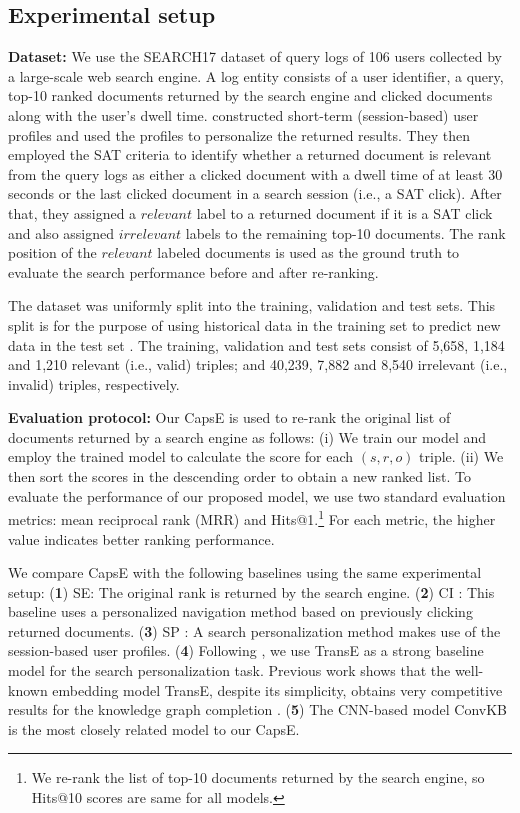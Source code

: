 \documentclass[11pt,a4paper]{article}
\begin{document}
\subsection{Experimental setup}

\noindent\textbf{Dataset:} 
We use the SEARCH17 dataset \citep{vu2017search} of query logs of 106 users collected by a large-scale web search engine.
A log entity consists of a user identifier, a query, top-10 ranked documents returned by the search engine and clicked documents along with the user's dwell time. \citet{vu2017search} constructed short-term (session-based) user profiles and used the profiles to personalize the returned results.
They then employed the SAT criteria \citep{FoxE2005} to identify whether a returned document is relevant from the query logs as either a clicked document with a dwell time of at least 30 seconds or the last clicked document in a search session (i.e., a SAT click). 
After that, they assigned a $relevant$ label to a returned document if it is a SAT click and also assigned $irrelevant$ labels to the remaining top-10 documents.
The rank position of the $relevant$ labeled documents is used as the ground truth to evaluate the search performance before and after re-ranking.



The dataset was uniformly split into the training, validation and test sets. This split is for the purpose of using historical data in the training set to predict new data in the test set \citep{vu2017search}. The training, validation and test sets consist of 5,658, 1,184 and 1,210 relevant (i.e., valid) triples; and 40,239, 7,882 and 8,540 irrelevant (i.e., invalid) triples, respectively.

\noindent\textbf{Evaluation protocol:} 
Our CapsE is used to re-rank the original list of documents returned by a search engine as follows: (i) We train our model and employ the trained model to calculate the score for each  $(s, r, o)$ triple. (ii) We then sort the scores in the descending order to obtain a new ranked list.
To evaluate the performance of our proposed model, we use two standard evaluation metrics: mean reciprocal rank (MRR) and Hits@1.\footnote{We re-rank the list of top-10 documents returned by the search engine, so Hits@10 scores are same for all models.}
For each metric, the higher value indicates better ranking performance.

We compare CapsE with the following baselines using the same experimental setup: (\textbf{1}) SE: The original rank is returned by the search engine. (\textbf{2}) CI \citep{Teevan2011}: This baseline uses a personalized navigation method based on previously clicking returned documents. (\textbf{3}) SP \citep{Bennett2012,Vu2015}: A search personalization method makes use of the session-based user profiles. (\textbf{4}) 
Following \citet{vu2017search}, we use TransE as a strong baseline model for the search personalization task.  Previous work shows that the well-known embedding model TransE, despite its simplicity, obtains very competitive results for the knowledge graph completion \citep{lin-EtAl:2015:EMNLP1,nickel2016holographic,Trouillon2016,Nguyen2016,Nguyen2018}. (\textbf{5}) The CNN-based model ConvKB is the most closely related model to our CapsE.
\end{document}
